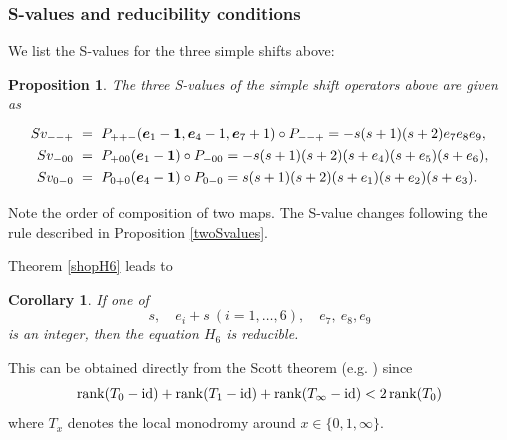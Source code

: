 \documentclass[a4paper,12pt]{article}
\newtheorem{cor}[thm]{Corollary}
\newtheorem{prp}[thm]{Proposition}
\theoremstyle{definition}
\theoremstyle{remark}
\numberwithin{equation}{section} %
\begin{document}
\subsubsection{S-values and reducibility conditions}
We list the S-values for the three simple shifts above:
\begin{prp}\label{SvalueE6}
  The three S-values of the simple shift operators above are given as
\[\def\arraystretch{1.3}\setlength\arraycolsep{3pt} \begin{array}{rcl}
Sv_{--+} &=& P_{++-}({\bm e}_1-{\bf 1}, {\bm e}_4-1, {\bm e}_7+1)\circ P_{--+}
       =-s(s+1)(s+2)e_7e_8e_9,\\
%
Sv_{-00}&=& P_{+00}({\bm e}_1-{\bf 1})\circ P_{-00}
      =-s(s + 1)(s + 2)(s + e_4)(s + e_5)(s + e_6),\\
%
Sv_{0-0} &=& P_{0+0}({\bm e}_4-{\bf 1})\circ P_{0-0}
      =s(s + 1)(s + 2)(s + e_1)(s + e_2)(s + e_3).\\
\end{array}\]
\end{prp}
Note the order of composition of two maps. The S-value changes
following the rule described in Proposition \ref{twoSvalues}. 
\par\smallskip
Theorem \ref{shopH6} %
leads to
\begin{cor}\label{redcondE6}If one of
$$s,\quad e_i+s\ (i=1,\dots,6),\quad e_7,\ e_8, e_9$$
is an integer, then the equation $H_6$ is reducible.
\end{cor}
This can be obtained directly from the Scott theorem (e.g. \cite{Scott,Osh}) since
$${\rm rank}(T_0-{\rm id})+{\rm rank}(T_1-{\rm id})+{\rm rank}(T_\infty-{\rm id})<2\,{\rm rank}(T_0)$$
where $T_x$ denotes the local monodromy around $x\in\{0,1,\infty\}$. 
\end{document}

